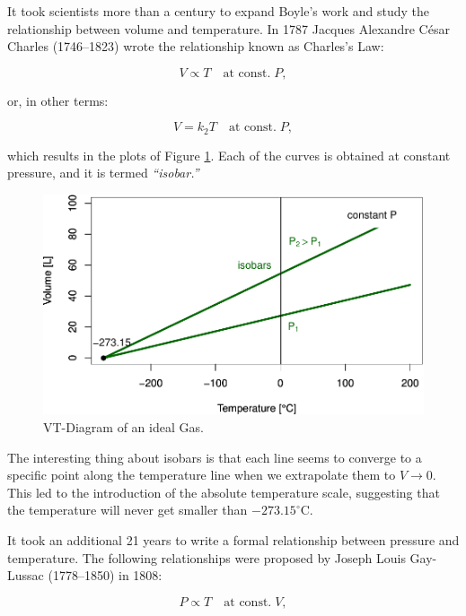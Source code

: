\documentclass[
  9pt,
]{extbook}
\theoremstyle{definition}
\theoremstyle{definition}
\theoremstyle{definition}
\theoremstyle{definition}
\theoremstyle{remark}
\begin{document}
It took scientists more than a century to expand Boyle's work and study the relationship between volume and temperature. In 1787 Jacques Alexandre César Charles (1746--1823) wrote the relationship known as Charles's Law:

\begin{equation}
V\propto T\quad\text{at const.}\;P,
\label{eq:charleslaw1}
\end{equation}

or, in other terms:

\begin{equation}
V=k_2 T\quad\text{at const.}\;P,
\label{eq:charleslaw2}
\end{equation}

which results in the plots of Figure \ref{fig:FigTVideal}. Each of the curves is obtained at constant pressure, and it is termed \emph{``isobar.''}

\begin{figure}

{\centering \includegraphics[width=0.7\linewidth]{pchem1_files/figure-latex/FigTVideal-1} 

}

\caption{VT-Diagram of an ideal Gas.}\label{fig:FigTVideal}
\end{figure}

The interesting thing about isobars is that each line seems to converge to a specific point along the temperature line when we extrapolate them to \(V\rightarrow 0\). This led to the introduction of the absolute temperature scale, suggesting that the temperature will never get smaller than \(-273.15^\circ\mathrm{C}\).

It took an additional 21 years to write a formal relationship between pressure and temperature. The following relationships were proposed by Joseph Louis Gay-Lussac (1778--1850) in 1808:

\begin{equation}
P\propto T\quad\text{at const.}\;V,
\label{eq:gaylussac1}
\end{equation}
\end{document}
